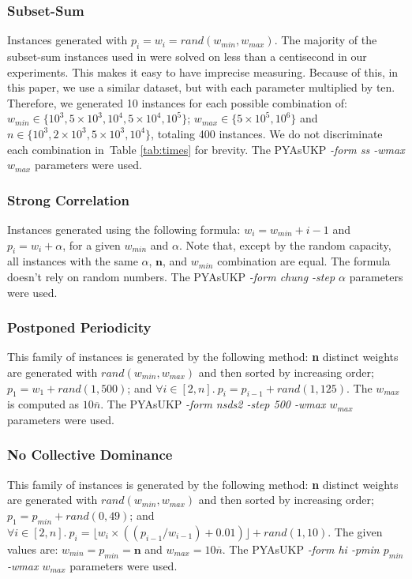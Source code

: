 \subsubsection{Subset-Sum}\label{sec:subsetsum}
Instances generated with \(p_i = w_i = rand(w_{min}, w_{max})\). 
The majority of the subset-sum instances used in \cite{pya} were solved on less than a centisecond in our experiments. 
This makes it easy to have imprecise measuring. 
Because of this, in this paper, we use a similar dataset, but with each parameter multiplied by ten. 
Therefore, we generated 10 instances for each possible combination of: \(w_{min} \in \{10^3, 5\times10^3, 10^4, 5\times10^4, 10^5\}\); \(w_{max} \in \{5\times10^5, 10^6\}\) and \(n \in \{10^3, 2\times10^3, 5\times10^3, 10^4\}\), totaling 400 instances. We do not discriminate each combination in~Table \ref{tab:times} for brevity. The PYAsUKP \emph{-form ss -wmax \(w_{max}\)} parameters were used.

\subsubsection{Strong Correlation}
Instances generated using the following formula: \(w_i = w_{min} + i - 1\) and \(p_i = w_i + \alpha\), for a given \(w_{min}\) and \(\alpha\).  Note that, except by the random capacity, all instances with the same \(\alpha\), \(\mathbf{n}\), and \(w_{min}\) combination are equal. The formula doesn't rely on random numbers. The PYAsUKP \emph{-form chung -step \(\alpha\) } parameters were used.

\subsubsection{Postponed Periodicity}
This family of instances is generated by the following method: \textbf{n} distinct weights are generated with \(rand(w_{min}, w_{max})\) and then sorted by increasing order; \(p_1 = w_1 + rand(1, 500)\); and \(\forall i \in [2, n].~p_i = p_{i-1} + rand(1, 125)\). The \(w_{max}\) is computed as \(10\overline{n}\). The PYAsUKP \emph{-form nsds2 -step 500 -wmax \(w_{max}\)} parameters were used.

\subsubsection{No Collective Dominance}
This family of instances is generated by the following method: \textbf{n} distinct weights are generated with \(rand(w_{min}, w_{max})\) and then sorted by increasing order; \(p_1 = p_{min} + rand(0, 49)\); and \(\forall i \in [2, n].~p_i = \lfloor w_i \times ((p_{i-1}/w_{i-1}) + 0.01)\rfloor + rand(1, 10)\). The given values are: \(w_{min} = p_{min} = \mathbf{n}\) and \(w_{max} = 10\overline{n}\). The PYAsUKP \emph{-form hi -pmin \(p_{min}\) -wmax \(w_{max}\)} parameters were used.


